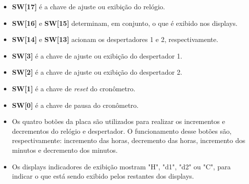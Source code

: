 \documentclass[14pt, oneside]{book}
\theoremstyle{definition}
\begin{document}

                 \begin{itemize}
                \item \textbf{SW[17]} é a chave de ajuste ou exibição do relógio.
                
                \item \textbf{SW[16]} e \textbf{SW[15]} determinam, em conjunto, o que é exibido nos displays.
                
                \item \textbf{SW[14]} e \textbf{SW[13]} acionam os despertadores 1 e 2, respectivamente.
                
                \item \textbf{SW[3]} é a chave de ajuste ou exibição do despertador 1. 
                
                \item \textbf{SW[2]} é a chave de ajuste ou exibição do despertador 2.
                
                \item \textbf{SW[1]} é a chave de \textit{reset} do cronômetro.
                
                \item \textbf{SW[0]} é a chave de pausa do cronômetro.
                
                \item Os quatro botões da placa são utilizados para realizar os incrementos e decrementos do relógio e despertador. O funcionamento desse botões são, respectivamente: incremento das horas, decremento das horas, incremento dos minutos e decremento dos minutos.
                
                \item Os displays indicadores de exibição mostram "H", "d1", "d2" ou "C", para indicar o que está sendo exibido pelos restantes dos displays. 
                
            \end{itemize}
                
\end{document}
